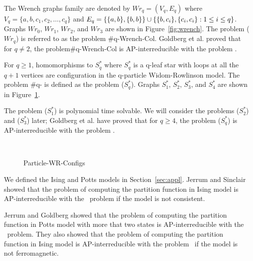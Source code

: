 \begin{example} \label{exm:wrench}
The Wrench graphs family are denoted by \(Wr_q=(V_q, E_q)\) where \(V_q=\{a,b,c_1,c_2,\dotsc,c_q\}\)
and \(E_q=\{{\{{a,b}\},\{{b,b}\}}\} \cup 
\{{\{{b,c_i}\},\{{c_i,c_i}\}:1\le i\le q}\}\)\@.
Graphs \(Wr_0\), \(Wr_1\), \(Wr_2\), and \(Wr_3\) are shown in Figure~\ref{fig:wrench}.
The problem \chom(\(Wr_q\)) is referred to as the problem \#q-{\sc Wrench-Col}. 
Goldberg et al. \cite{Leslie03} proved that for \(q\neq 2\), the problem\#q-{\sc Wrench-Col} 
is AP-interreducible with the problem \csat\@.
\end{example}

\begin{example}  \label{exm:particles}
For \(q \ge 1\), homomorphisms to \(S^*_q\) where
\(S^*_q\) is a q-leaf star with loops at all the \(q+1\)
vertices are configuration in the q-particle Widom-Rowlinson model.
The problem \#q- is defined as the problem \chom(\(S^*_q\)).
Graphs \(S^*_1\), \(S^*_2\), \(S^*_3\), and \(S^*_4\) are shown in Figure~\ref{fig:wrconfigs}.
 
The problem \chom(\(S^*_1\)) is polynomial time solvable.
We will consider the problems \chom(\(S^*_2\)) and \chom(\(S^*_3\)) later;
Goldberg et al. \cite{Leslie03} have proved that 
for \(q \ge 4\), the problem \chom(\(S^*_q\)) is AP-interreducible with the problem \csat\@.
\end{example}

\begin{figure}[h]
\centering 
\subfigure[\ensuremath{S^*_1}]{\label{fig:ss1}}\hspace{5cm}
\subfigure[\ensuremath{S^*_2}]{\label{fig:ss2}}\\
\subfigure[\ensuremath{S^*_3}]{\label{fig:ss3}}\hspace{5cm}
\subfigure[\ensuremath{S^*_4}]{\label{fig:ss4}}
\caption{Particle-WR-Configs}
\label{fig:wrconfigs}
\end{figure}

We defined the Ising and Potts models in Section~\ref{sec:appl}\@.
Jerrum and Sinclair \cite{Jer93} showed that the problem of computing
the partition function in Ising model is AP-interreducible with the \csat\ problem
if the model is not consistent.

Jerrum and Goldberg \cite{Goldberg2007} showed that the problem of computing 
the partition function in Potts model with more that two states is
AP-interreducible with the \csat\ problem. They also showed that the problem of computing
the partition function in Ising model is AP-interreducible with the problem \csat\
if the model is not ferromagnetic.

